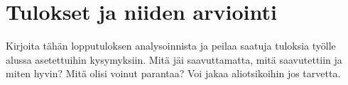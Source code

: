 \chapter{Tulokset ja niiden arviointi}
\label{ch:tulokset}
\begin{it}
	Kirjoita tähän lopputuloksen analysoinnista ja peilaa saatuja tuloksia työlle alussa asetettuihin kysymyksiin. Mitä jäi saavuttamatta, mitä saavutettiin ja miten hyvin? Mitä olisi voinut parantaa? Voi jakaa aliotsikoihin jos tarvetta.
\end{it}